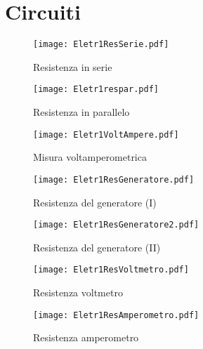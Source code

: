\section{Circuiti}
\begin{figure}[width=0.7\textwidth]
 \centering 
 \texttt{[image: Eletr1ResSerie.pdf]} 
 \caption{Resistenza in serie} 
 \label{gr:02_graph_4.tex}
\end{figure}

\begin{figure}[width=0.7\textwidth]
 \centering 
 \texttt{[image: Eletr1respar.pdf]} 
 \caption{Resistenza in parallelo} 
 \label{gr:02_graph_4.tex}
\end{figure}

\begin{figure}[width=0.7\textwidth]
 \centering 
 \texttt{[image: Eletr1VoltAmpere.pdf]} 
 \caption{Misura voltamperometrica} 
 \label{gr:02_graph_4.tex}
\end{figure}


\begin{figure}[width=0.7\textwidth]
 \centering 
 \texttt{[image: Eletr1ResGeneratore.pdf]} 
 \caption{Resistenza del generatore (I)} 
 \label{gr:02_graph_4.tex}
\end{figure}

\begin{figure}[width=0.7\textwidth]
 \centering 
 \texttt{[image: Eletr1ResGeneratore2.pdf]} 
 \caption{Resistenza del generatore (II)} 
 \label{gr:02_graph_4.tex}
\end{figure}

\begin{figure}[width=0.7\textwidth]
 \centering 
 \texttt{[image: Eletr1ResVoltmetro.pdf]} 
 \caption{Resistenza voltmetro} 
 \label{gr:02_graph_4.tex}
\end{figure}

\begin{figure}[width=0.7\textwidth]
 \centering 
 \texttt{[image: Eletr1ResAmperometro.pdf]} 
 \caption{Resistenza amperometro} 
 \label{gr:02_graph_4.tex}
\end{figure}